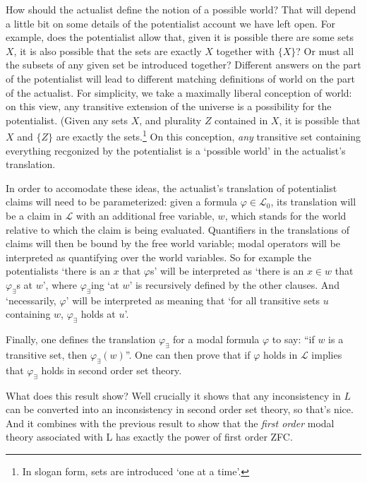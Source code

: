 \documentclass{article}
\begin{document}
How should the actualist define the notion of a possible world? That will depend a 
little bit on some details of the potentialist account we have left open. For example, 
does the potentialist allow that, given it is possible there are some sets $X$, it is also 
possible that the sets are exactly $X$ together with $\{X\}$? Or must 
all the subsets of any given set be introduced together? Different answers on the 
part of the potentialist will lead to different matching definitions of world on 
the part of the actualist. For simplicity, we take a maximally liberal conception of 
world: on this view, any transitive extension of the universe is a possibility for the 
potentialist. (Given any sets $X$, and plurality $Z$ contained in $X$, it is possible 
that $X$ and $\{Z\}$ are exactly the sets.\footnote{
    In slogan form, sets are introduced `one at a time'.} On this conception, \emph{any}
transitive set containing everything recgonized by the potentialist is a `possible world'
in the actualist's translation.

In order to accomodate these ideas, the actualist's translation of potentialist claims 
will need to be parameterized: given a formula $\varphi \in \mathcal{L}_0$, its 
translation will be a claim in $\mathcal{L}$ with an additional free variable, $w$, 
which stands for the world relative to which the claim is being evaluated. Quantifiers 
in the translations of claims will then be bound by the free world variable; 
modal operators will be interpreted as quantifying over the world variables. So for
example the potentialists `there is an $x$ that $\varphi$s' will be interpreted as 
`there is an $x \in w$ that $\varphi_\exists$s at $w$', where $\varphi_\exists$ing `at $w$' is recursively 
defined by the other clauses. And `necessarily, $\varphi$' will be interpreted as meaning 
that `for all transitive sets $u$ containing $w$, $\varphi_\exists$ holds at $u$'.

Finally, one defines the translation $\varphi_\exists$ for a modal formula $\varphi$ 
to say: ``if $w$ is a transitive set, then $\varphi_\exists(w)$''.
One can then prove that if $\varphi$ holds in $\mathcal{L}$ implies that 
$\varphi_\exists$ holds in second order set theory.

What does this result show? Well crucially it shows that any inconsistency in 
$L$ can be converted into an inconsistency in second order set theory, 
so that's nice. And it combines with the previous result to show that the 
\emph{first order} modal theory associated with L has exactly the power 
of first order ZFC.
\end{document}
